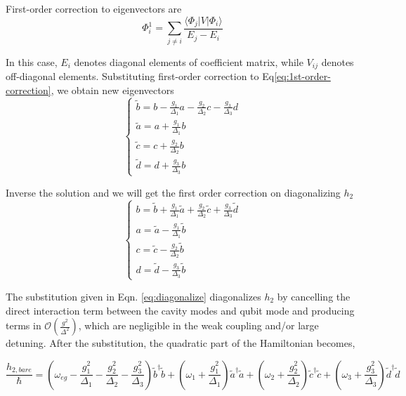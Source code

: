 	First-order correction to eigenvectors are
	\begin{equation} \label{eq:1st-order-correction}
		\Phi_i^1 = \sum _{j \neq i} \frac{\langle \Phi_j | V | \Phi_i \rangle}{E_j - E_i}
	\end{equation}

In this case, ${E_i}$ denotes diagonal elements of coefficient matrix, while ${V_{ij}}$ denotes off-diagonal elements. Substituting first-order correction to Eq\ref{eq:1st-order-correction}, we obtain new eigenvectors
\begin{equation}
	\begin{cases}
		\tilde{b} = b - \frac{g_1}{\Delta_1} a - \frac{g_2}{\Delta_2} c - \frac{g_3}{\Delta_3} d \\
		\tilde{a} = a + \frac{g_1}{\Delta_1} b \\
		\tilde{c} = c + \frac{g_2}{\Delta_2} b \\
		\tilde{d} = d + \frac{g_3}{\Delta_3} b
	\end{cases}
\end{equation}

Inverse the solution and we will get the first order correction on diagonalizing $h_2$
\begin{equation} \label{eq:diagonalize}
	\begin{cases}
		b = \tilde{b} + \frac{g_1}{\Delta_1} \tilde{a} + \frac{g_2}{\Delta_2} \tilde{c} +\frac{g_3}{\Delta_3} \tilde{d} \\
		a = \tilde{a} - \frac{g_1}{\Delta_1} \tilde{b} \\
		c = \tilde{c} - \frac{g_2}{\Delta_2} \tilde{b} \\
		d = \tilde{d} - \frac{g_3}{\Delta_3} \tilde{b}
	\end{cases}
\end{equation}

The substitution given in Eqn. \ref{eq:diagonalize} diagonalizes $h_2$ by cancelling the direct interaction term between the cavity modes and qubit mode and producing terms in $\mathcal{O}(\frac{g^2}{\Delta^2})$, which are negligible in the weak coupling and/or large detuning.  After the substitution, the quadratic part of the Hamiltonian becomes, 

\begin{equation} \label{eq:h2_bare_tilde}
    \frac{h_{2,bare}}{\hbar} = (\omega_{eg}-\frac{g_1^2}{\Delta_1}-\frac{g_2^2}{\Delta_2}-\frac{g_3^2}{\Delta_3})\tilde{b}^\dagger \tilde{b} + (\omega_1+\frac{g_1^2}{\Delta_1})\tilde{a}^\dagger \tilde{a}+ (\omega_2+\frac{g_2^2}{\Delta_2})\tilde{c}^\dagger \tilde{c} + (\omega_3+\frac{g_3^2}{\Delta_3})\tilde{d}^\dagger \tilde{d}
\end{equation}

